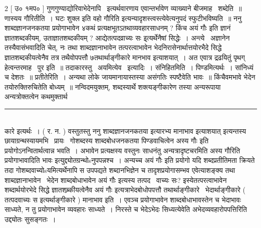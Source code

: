 \documentclass[11pt, openany]{book}
\makeatletter
\newcommand{\devanagarinumeral}[1]{
\devanagaridigits{\number \csname c@#1\endcsname}} %
\makeatother
\begin{document}
\begin{multicols}{2}
 [ उ० १मप० ] गुणगुण्याद्योरिवाभेदेनापि \textendash\ इत्यर्थवारणाय एवान्तर्भावेण व्याख्याने बीजमाह \textendash\ शब्देति~॥ णास्यय गौरितीति~। {\qt घटः शुक्ल इति वहो गौरिति} इत्यन्यादृशस्त्वस्त्येवेत्यनुपदं स्फुटीभविष्यति~॥ ननु शाब्दज्ञानजनकतया प्रयोगाभावेन ४कथं प्रत्यक्षभूतऽतथाव्यवहारसाधनम् ? किंच अयं गौः इति ज्ञानं ज्ञातशब्दकीयम्, उताज्ञातशब्दकीयम् ? आद्येतत्पदव्राच्यः सः इ्त्यर्थेनैषां सिद्धेः~। अन्त्ये \textendash\ अज्ञानेन तस्यैवासंभवादिति चेत्, नः तथा शाब्दज्ञानाभावेन तत्परत्वाभावेन भेदनिरासेनार्थात्तयोरभैदे सिद्धे ज्ञातशब्दकीयत्वेनैव तत्र तथैवोपपत्तौ ७तथार्थाङ्गीकारे मानभाव इत्याशयात्~। अत एवात्र द्रढयितुं पृथग् हेत्वन्तरमाह \textendash\ पुर इति~॥ तदाकारस्तु \textendash\ अयमित्येव \textendash\ इत्यादिः~। संनिहितमिति~। पिण्डमित्यर्थः~। सांनिध्यं च देशतः~॥ प्रतीतेरिति~। अन्यथा लोके जायमानायास्तस्या असंगतिः स्पष्टैवेति भावः~॥ किंचैवमभावे भेदेन तयोरुक्तिरुचितेति बोध्यम्~॥ नन्विदमयुक्तम्, शब्दस्यार्थे शक्त्यङ्गीकारेण तस्या अन्यरूपाया अन्यत्रोक्तत्वेन कथमुक्तार्थ \textendash\

\noindent
\rule{1\linewidth}{0.5pt}\\

\noindent
कारे इत्यर्थः~। ( र. न. ) वस्तुतस्तु ननु शाब्दज्ञानजनकतया इत्यारभ्य {\qt मानाभाव इत्याशयात्} इत्यन्तस्य छायाग्रन्थस्यायमभि \textendash\ प्रायः \textendash\ गोशब्दस्य शाब्दबोधजनकतया पिण्डवाचित्वेन अस्य गौः इति प्रयोगोऽनन्वितार्थत्वान्न भवति~। अभावेन प्रत्यक्षस्य वस्तुनः साधनंतु अन्यत्रादृष्टचरमिति {\qt अस्य गौरिति प्रयोगाभावादिति भावः} इत्युद्द्योतग्रन्थोsनुपपन्नश्च~। अन्यच्च {\qt अयं गौः} इति प्रयोगो यदि शब्दप्रतीतिमता क्रियते तदा गोशब्दवाच्योsयमित्यर्थेनापि स उपपद्यते शब्दानभिज्ञेन च तादृशप्रयोगासम्भव एवेत्याशङ्क्य तथा शाब्दज्ञानाभावेन \textendash\ भेदेन शाब्दबोधाभावेन {\qt अयं गौः इत्यस्य} तत्पद \textendash\ वाच्यः सः? इस्येतत्परत्वाभावेन शब्दार्थयोरभेदे सिद्धे {\qt ज्ञातशब्र्कीयत्वेनैव अयं गौः} इत्यत्राभेदबोधोपपत्तौ तथार्थाङ्गीकारे \textendash\ भेदार्थाङ्गीकारे ( तत्पदवाच्यः स इत्यर्थाङ्गीकारे ) मानाभाव इति~। एवञ्च प्रयोगाभावेन शाब्दबोधाभावस्तेन च भेदाभावः साध्यते, न तु प्रयोगाभावेन व्यवहारः साध्यते~। निरस्ते च भेदेऽभेदः सिध्यत्येवेति अभेदव्यवहारोपपत्तिरिति उद्द्योतः सुसङ्गतः~।
\end{multicols}

\fancyhead[RE]{[ १ अ. १ पा. १ पस्पशाह्रिकै}
\fancyhead[LO]{}
\fancyhead[LE,RO]{\thepage}
\cfoot{}
\newpage
\renewcommand{\thepage}{\devanagarinumeral{page}}
\setcounter{page}{13}
\end{document}
